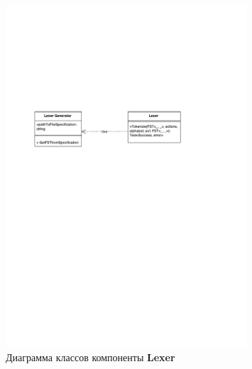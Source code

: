 \documentclass{matmex-diploma}
\begin{document}
\begin{figure}[h!]
\begin{center}
\includegraphics[width=0.8\textwidth]{ClassDiagramLexer}
\caption{Диаграмма классов компоненты \textbf{Lexer}}
\label{fig:ClassLexer} 
\end{center}
\end{figure}
\end{document}
